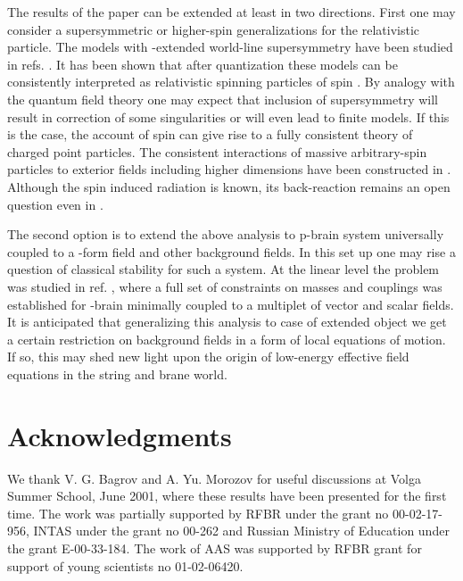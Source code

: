 \documentclass[a4paper,12pt]{article}
\begin{document}
The results of the paper can be extended at least in two directions. First
one may consider a supersymmetric or higher-spin generalizations for the
relativistic particle. The models with \coordHE{}-extended world-line supersymmetry
have been studied in refs. \cite{GT,HPPT}. It has been shown that after
quantization these models can be consistently interpreted as relativistic
spinning particles of spin \coordHE{}. By analogy with the quantum field theory
one may expect that inclusion of supersymmetry will result in correction of
some singularities or will even lead to finite models. If this is the case,
the account of spin can give rise to a fully consistent theory of charged
point particles. The consistent interactions of massive arbitrary-spin
particles to exterior fields including higher dimensions have been
constructed in \cite{LShS,LShSh}. Although the spin induced radiation is
known, its back-reaction remains an open question even in \coordHE{}.

The second option is to extend the above analysis to p-brain system
universally coupled to a \coordHE{}-form field and other background fields. In this
set up one may rise a question of classical stability for such a system. At
the linear level the problem was studied in ref. \cite{VH}, where a full set
of constraints on masses and couplings was established for \coordHE{}-brain
minimally coupled to a multiplet of vector and scalar fields. It is
anticipated that generalizing this analysis to case of extended object we
get a certain restriction on background fields in a form of local equations of
motion. If so, this may shed new light upon the origin of low-energy
effective field equations in the string and brane world.

\section*{Acknowledgments}

We thank V. G. Bagrov and A. Yu. Morozov for useful discussions at Volga
Summer School, June 2001, where these results have been presented for the
first time. The work was partially supported by RFBR under the grant no
00-02-17-956, INTAS under the grant no 00-262 and Russian Ministry of
Education under the grant E-00-33-184. The work of AAS was supported by RFBR
grant for support of young scientists no 01-02-06420.
\end{document}
